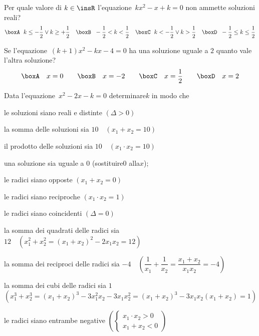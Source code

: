 \begin{esercizio}
 \label{ese:3.105}
 Per quale valore di \(k \in \insR\) l'equazione~\(kx^{2}-x + k = 0\) non 
ammette soluzioni reali?
\[\boxA\;~ k \leq-\dfrac{1}{2} \vee k \geq + \dfrac{1}{2}\quad\boxB\;~ - 
\dfrac{1}{2} 
< k < \dfrac{1}{2}\quad\boxC\;~ k <-\dfrac{1}{2} \vee k > 
\dfrac{1}{2}\quad\boxD\;~ - 
\dfrac{1}{2} \leq k \leq \dfrac{1}{2}\]
\end{esercizio}

\begin{esercizio}
 \label{ese:3.111}
Se l'equazione~\((k + 1) x^{2}-kx-4 = 0\) ha una soluzione uguale a \(2\) 
quanto 
vale l'altra soluzione?
\[\boxA\quad x = 0\qquad\boxB\quad x =-2\qquad\boxC\quad x = 
\dfrac{1}{2}\qquad\boxD\quad x = 2\]
\end{esercizio}

\begin{esercizio}[\Ast]
 \label{ese:3.97}
Data l'equazione~\(x^{2}-2 x-k = 0\) determinare\(k\) in modo che
\begin{enumeratea}
\item le soluzioni siano reali e distinte \quad\((\Delta>0)\)
\item la somma delle soluzioni sia \(10 \quad (x_{1} + x_{2} = 10)\)
\item il prodotto delle soluzioni sia \(10 \quad (x_{1} \cdot x_{2} = 10)\)
\item una soluzione sia uguale a \(0\) \quad (sostituire\(0\) alla\(x\));~
\item le radici siano opposte \quad \((x_{1} + x_{2} = 0)\)
\item le radici siano reciproche \quad \((x_{1} \cdot x_{2} = 1)\)
\item le radici siano coincidenti \quad \((\Delta=0)\)
\item la somma dei quadrati delle radici sia \(12 \quad \left(x_{1}^{2} + 
x_{2}^{2} = (x_{1} + x_{2})^{2}-2x_{1} x_{2} = 12\right)\)
\item la somma dei reciproci delle radici sia \(-4 \quad 
\left(\dfrac{1}{x_{1}} + 
\dfrac{1}{x_{2}} = \dfrac{x_{1} +x_{2}}{x_{1} x_{2}} =-4 \right)\)
\item la somma dei cubi delle radici sia \(1\) \protect\\ \(\left( x_{1}^{3} + 
x_{2}^{3} = (x_{1} + x_{2})^{3}-3x_{1}^{2} x_{2}-3x_{1} x_{2}^{2} = (x_{1} 
+ 
x_{2})^{3}-3x_{1} x_{2} (x_{1} + x_{2}) = 1\right)\)
\item le radici siano entrambe negative \(\left(\left\{\begin{array}{l} 
x_{1} 
\cdot x_{2} > 0 \\x_{1} + x_{2} < 0 \end{array}\right.\right)\)
\end{enumeratea}
\end{esercizio}

